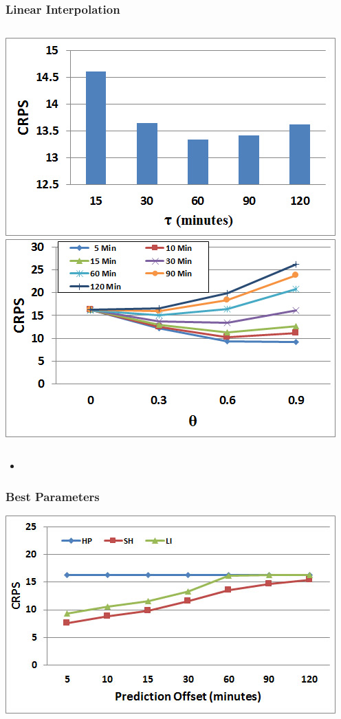 \documentclass[t]{beamer}
\begin{document}
\begin{frame}\frametitle{Linear Interpolation}
\vspace{0.5in}
\begin{columns}
		\includegraphics[scale=0.3]{Links_Interpolated_TimeHorizon.jpg}
		\includegraphics[scale=0.3]{Links_Interpolated_Theta.jpg}
\end{columns}
\begin{itemize}
\item 
\end{itemize}
\end{frame}

\begin{frame}\frametitle{Best Parameters}
\begin{center}
	\includegraphics[scale=0.5]{Links_Best.jpg}
\end{center}
\end{frame}
\end{document}
